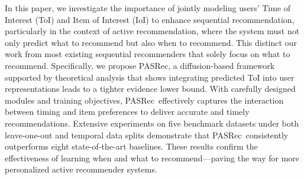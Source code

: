 \documentclass[sigconf,nonacm]{acmart}
\newcommand{\modelname}{PASRec}
\begin{document}
In this paper, we investigate the importance of jointly modeling users’ Time of Interest (ToI) and Item of Interest (IoI) to enhance sequential recommendation, particularly in the context of active recommendation, where the system must not only predict what to recommend but also when to recommend. This distinct our work from most existing sequential recommenders that solely focus on what to recommend.
Specifically, we propose \modelname, a diffusion-based framework supported by theoretical analysis that shows integrating predicted ToI into user representations leads to a tighter evidence lower bound. With carefully designed modules and training objectives, \modelname\ effectively captures the interaction between timing and item preferences to deliver accurate and timely recommendations. 
Extensive experiments on five benchmark datasets under both leave-one-out and temporal data splits demonstrate that \modelname\ consistently outperforms eight state-of-the-art baselines. These results confirm the effectiveness of learning when and what to recommend—paving the way for more personalized active recommender systems.


\clearpage



\clearpage

\appendix
\end{document}
